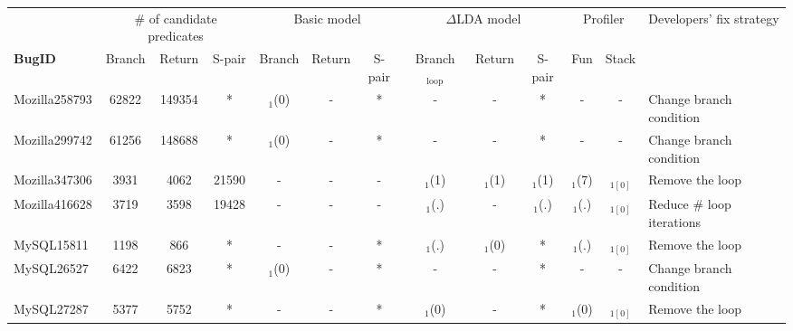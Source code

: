 \begin{landscape}
\begin{table*}
  \centering
  \scriptsize
  \newcommand{\Yes}[1]{\checkmark{}$_#1$}
  \newcommand{\Yess}[0]{\checkmark{}}
  \newcommand{\No}[0]{-}
  {
  \begin{tabular}{lcccccccccccl}
    \toprule
                 &\multicolumn{3}{c}{\# of candidate predicates}& \multicolumn{3}{c}{Basic model}& \multicolumn{3}{c}{$\Delta$LDA model}&\multicolumn{2}{c}{Profiler}&Developers' fix strategy\\
\cmidrule(lr){2-4}
\cmidrule(lr){5-7}
\cmidrule(lr){8-10}
\cmidrule(lr){11-12}
    {\bf BugID}    & {Branch} & {Return} & {S-pair} & {Branch}    & {Return}    & {S-pair}   & {Branch$_{\text{loop}}$}     &  {Return}  & {S-pair}   & Fun         & Stack            &\\
    \midrule
    Mozilla258793  &  62822   & 149354   &  *       & \Yes{1}(0)  & \No         &  *         & \No          &  \No       &  *         & \No         &\No            & Change branch condition\\
    Mozilla299742  &  61256   & 148688   &  *       & \Yes{1}(0)  & \No         &  *         & \No          &  \No       &  *         & \No         &\No            & Change branch condition\\
    Mozilla347306  &   3931   & 4062     &  21590   & \No         & \No         & \No        & \Yes{1}(1)   & \Yes{1}(1) &\Yes{1}(1)  & \Yes{1}(7)  &\Yess$_{1[0]}$  & Remove the loop\\
    Mozilla416628  &   3719   & 3598     &  19428   & \No         & \No         & \No        & \Yes{1}($.$) &  \No       &\Yes{1}($.$)& \Yes{1}($.$)&\Yess$_{1[0]}$  & Reduce \# loop iterations\\
    \midrule                                                                                                         
    MySQL15811     &   1198   & 866      &  *       & \No         & \No         &    *       & \Yes{1}($.$) &\Yes{1}(0)  &  *         & \Yes{1}($.$)&\Yess$_{1[0]}$  & Remove the loop\\
    MySQL26527     &   6422   & 6823     &  *       & \Yes{1}(0)  & \No         &  *         & \No          & \No        &  *         & \No         &\No            & Change branch condition\\
    MySQL27287     &   5377   & 5752     &  *       & \No         & \No         &  *         & \Yes{1}(0)   & \No        &  *         & \Yes{1}(0)  &\Yess$_{1[0]}$  & Remove the loop\\

\end{tabular}}
\end{table*}
\end{landscape}

